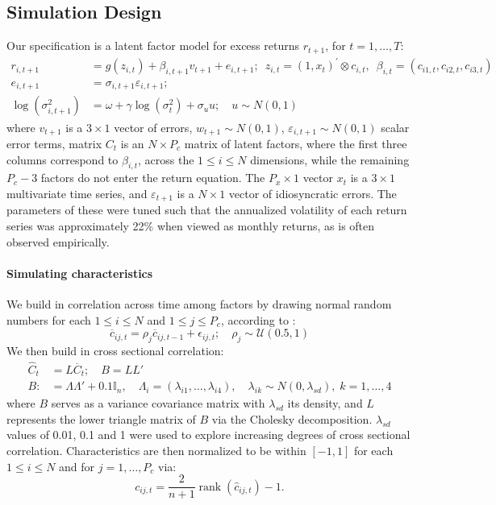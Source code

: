 \documentclass{article}
\begin{document}
\subsection{Simulation Design}\label{app:simDesign}
Our specification is a latent factor model for excess returns $r_{t+1}$, for $t=1, \dots, T$:
\begin{align*}
r_{i, t+1} &= 
g\left(z_{i, t}\right) + \beta_{i,t+1}v_{t+1} + e_{i, t+1}; 
\enspace z_{i, t} = \left(1, x_{t}\right)^{\prime} \otimes c_{i, t}, 
\enspace \beta_{i, t} = \left(c_{i 1, t}, c_{i 2, t}, c_{i 3, t}\right) \\ 
e_{i, t+1} &= 
\sigma_{i, t+1} \varepsilon_{i, t+1}; \\
\operatorname{log} (\sigma^2_{i,t+1}) &= 
\omega + \gamma \operatorname{log} (\sigma^2_{t}) + \sigma_{u}u;
\quad u \sim N(0, 1)
\end{align*}
where $v_{t+1}$ is a $3\times 1$ vector of errors, $w_{t+1} \sim N(0, 1)$,  $\varepsilon_{i,t+1} \sim N(0, 1)$ scalar error terms, matrix $C_t$ is an $N\times P_c$ matrix of latent factors, where the first three columns correspond to $\beta_{i,t}$, across the $1\leq i\leq N$ dimensions, while the remaining $P_c-3$ factors do not enter the return equation. The $P_x\times1$ vector $x_t$ is a $3 \times 1$ multivariate time series, and $\varepsilon_{t+1}$ is a $N\times 1$ vector of idiosyncratic errors. The parameters of these were tuned such that the annualized volatility of each return series was approximately 22\% when viewed as monthly returns, as is often observed empirically.
\paragraph{Simulating characteristics}
We build in correlation across time among factors by drawing normal random numbers for each $1\leq i\leq N$ and $1\leq j\leq P_{c}$, according to :
\begin{equation}
\overline{c}_{i j, t} = \rho_{j} \overline{c}_{i j, t-1}+\epsilon_{i j, t} ;
\quad \rho_{j} \sim \mathcal{U} \left( 0.5, 1 \right) 
\end{equation}
We then build in cross sectional correlation:
\begin{align}
\widehat{C}_{t}&=L\overline{C}_{t} ; \quad B = LL' \\
B:&=\Lambda\Lambda' + 0.1\mathbb{I}_{n}, \quad
\Lambda_i = (\lambda_{i1}, \dots, \lambda_{i4}), \quad
\lambda_{ik}\sim N(0, \lambda_{sd}), \; k=1, \dots, 4
\end{align}
where $B$ serves as a variance covariance matrix with $\lambda_{sd}$ its density, and $L$ represents the lower triangle matrix of $B$ via the Cholesky decomposition. $\lambda_{sd}$ values of 0.01, 0.1 and 1 were used to explore increasing degrees of cross sectional correlation.
Characteristics are then normalized to be within $[-1, 1]$ for each $1\leq i\leq N$ and for $j=1, \dots, P_{c}$ via:
\begin{equation}
c_{i j, t} = \frac{2}{n+1} \operatorname{rank}\left(\hat{c}_{i j, t}\right) - 1.
\end{equation}
\end{document}
